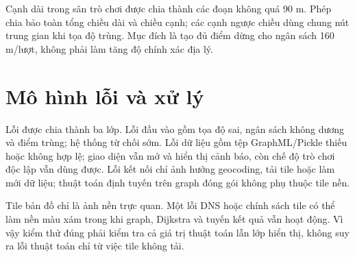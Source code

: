 Cạnh dài trong sân trò chơi được chia thành các đoạn không quá 90 m. Phép chia
bảo toàn tổng chiều dài và chiều cạnh; các cạnh ngược chiều dùng chung nút trung
gian khi tọa độ trùng. Mục đích là tạo đủ điểm dừng cho ngân sách 160 m/lượt,
không phải làm tăng độ chính xác địa lý.

\section{Mô hình lỗi và xử lý}

Lỗi được chia thành ba lớp. Lỗi đầu vào gồm tọa độ sai, ngân sách không dương và
điểm trùng; hệ thống từ chối sớm. Lỗi dữ liệu gồm tệp GraphML/Pickle thiếu hoặc
không hợp lệ; giao diện vẫn mở và hiển thị cảnh báo, còn chế độ trò chơi độc lập
vẫn dùng được. Lỗi kết nối chỉ ảnh hưởng geocoding, tải tile hoặc làm mới dữ liệu;
thuật toán định tuyến trên graph đóng gói không phụ thuộc tile nền.

\begin{notebox}[title={Phân biệt bản đồ nền và thuật toán}]
Tile bản đồ chỉ là ảnh nền trực quan. Một lỗi DNS hoặc chính sách tile có thể làm
nền màu xám trong khi graph, Dijkstra và tuyến kết quả vẫn hoạt động. Vì vậy kiểm
thử đúng phải kiểm tra cả giá trị thuật toán lẫn lớp hiển thị, không suy ra lỗi
thuật toán chỉ từ việc tile không tải.
\end{notebox}

